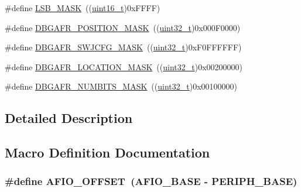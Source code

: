 \begin{DoxyCompactItemize}
\item 
\#define \hyperlink{group___g_p_i_o___private___defines_ga338d54179ac0da2af2363e3a930bf374}{L\+S\+B\+\_\+\+M\+A\+SK}~((\hyperlink{_p_e___types_8h_a1f1825b69244eb3ad2c7165ddc99c956}{uint16\+\_\+t})0x\+F\+F\+F\+F)
\item 
\#define \hyperlink{group___g_p_i_o___private___defines_gafa4eba58b1839413acb4591da00e7559}{D\+B\+G\+A\+F\+R\+\_\+\+P\+O\+S\+I\+T\+I\+O\+N\+\_\+\+M\+A\+SK}~((\hyperlink{_p_e___types_8h_a33594304e786b158f3fb30289278f5af}{uint32\+\_\+t})0x000\+F0000)
\item 
\#define \hyperlink{group___g_p_i_o___private___defines_ga47a1cd3c0505a7be3e161671237d8460}{D\+B\+G\+A\+F\+R\+\_\+\+S\+W\+J\+C\+F\+G\+\_\+\+M\+A\+SK}~((\hyperlink{_p_e___types_8h_a33594304e786b158f3fb30289278f5af}{uint32\+\_\+t})0x\+F0\+F\+F\+F\+F\+F\+F)
\item 
\#define \hyperlink{group___g_p_i_o___private___defines_gaab83406f875057e96458940ca9519b7d}{D\+B\+G\+A\+F\+R\+\_\+\+L\+O\+C\+A\+T\+I\+O\+N\+\_\+\+M\+A\+SK}~((\hyperlink{_p_e___types_8h_a33594304e786b158f3fb30289278f5af}{uint32\+\_\+t})0x00200000)
\item 
\#define \hyperlink{group___g_p_i_o___private___defines_gaea2fa480dea4d6e061eaa1417a9196dc}{D\+B\+G\+A\+F\+R\+\_\+\+N\+U\+M\+B\+I\+T\+S\+\_\+\+M\+A\+SK}~((\hyperlink{_p_e___types_8h_a33594304e786b158f3fb30289278f5af}{uint32\+\_\+t})0x00100000)
\end{DoxyCompactItemize}


\subsection{Detailed Description}


\subsection{Macro Definition Documentation}
\subsubsection[{\texorpdfstring{A\+F\+I\+O\+\_\+\+O\+F\+F\+S\+ET}{AFIO_OFFSET}}]{\setlength{\rightskip}{0pt plus 5cm}\#define A\+F\+I\+O\+\_\+\+O\+F\+F\+S\+ET~({\bf A\+F\+I\+O\+\_\+\+B\+A\+SE} -\/ {\bf P\+E\+R\+I\+P\+H\+\_\+\+B\+A\+SE})}\hypertarget{group___g_p_i_o___private___defines_ga0ecdd0dd5180e1ee385c22f66a2cd660}{}\label{group___g_p_i_o___private___defines_ga0ecdd0dd5180e1ee385c22f66a2cd660}



